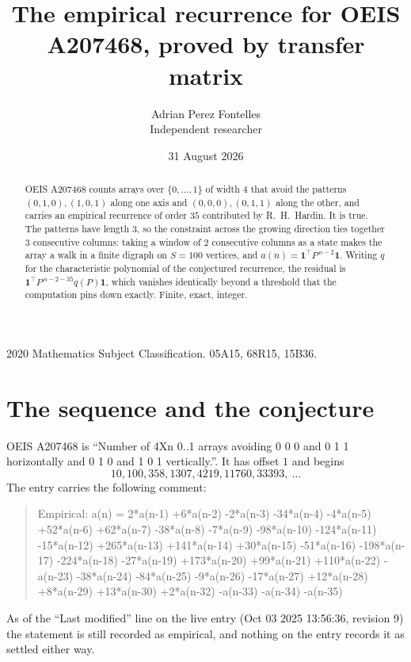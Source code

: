 \documentclass[11pt,a4paper]{article}
\title{The empirical recurrence for OEIS A207468, proved by transfer matrix}
\author{Adrian Perez Fontelles\\ \small Independent researcher}
\date{31 August 2026}
\theoremstyle{plain}
\theoremstyle{definition}
\begin{document}
\maketitle

\begin{abstract}
OEIS A207468 counts arrays over $\{0,\dots,1\}$ of width $4$ that avoid the patterns
$(0,1,0), (1,0,1)$ along one axis and $(0,0,0), (0,1,1)$ along the other, and carries an empirical recurrence of
order $35$ contributed by R.~H.~Hardin. It is true. The patterns have length $3$, so
the constraint across the growing direction ties together $3$ consecutive columns: taking a
window of $2$ consecutive columns as a state makes the array a walk in a finite digraph
on $S=100$ vertices, and $a(n)=\mathbf{1}^{\!\top}P^{\,n-2}\mathbf{1}$. Writing $q$
for the characteristic polynomial of the conjectured recurrence, the residual is
$\mathbf{1}^{\!\top}P^{\,n-2-35}q(P)\mathbf{1}$, which vanishes identically
beyond a threshold that the computation pins down exactly. Finite, exact, integer.
\end{abstract}

\noindent\small 2020 Mathematics Subject Classification. 05A15, 68R15, 15B36.\normalsize

\section{The sequence and the conjecture}

OEIS A207468 is ``Number of 4Xn 0..1 arrays avoiding 0 0 0 and 0 1 1 horizontally and 0 1 0 and 1 0 1 vertically.''. It has offset
$1$ and begins
\[
10, 100, 358, 1307, 4219, 11760, 33393,\ \dots
\]
The entry carries the following comment:
\begin{quote}\small
Empirical: a(n) = 2*a(n-1) +6*a(n-2) -2*a(n-3) -34*a(n-4) -4*a(n-5) +52*a(n-6) +62*a(n-7) -38*a(n-8) -7*a(n-9) -98*a(n-10) -124*a(n-11) -15*a(n-12) +265*a(n-13) +141*a(n-14) +30*a(n-15) -51*a(n-16) -198*a(n-17) -224*a(n-18) -27*a(n-19) +173*a(n-20) +99*a(n-21) +110*a(n-22) -a(n-23) -38*a(n-24) -84*a(n-25) -9*a(n-26) -17*a(n-27) +12*a(n-28) +8*a(n-29) +13*a(n-30) +2*a(n-32) -a(n-33) -a(n-34) -a(n-35)
\end{quote}
As of the ``Last modified'' line on the live entry (Oct 03 2025 13:56:36, revision
9) the statement is still recorded as empirical, and nothing on the entry
records it as settled either way.
\end{document}

